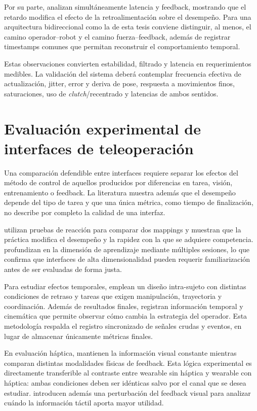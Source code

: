 Por su parte, \textcite{louca2024haptic} analizan simultáneamente latencia y feedback, mostrando que el retardo modifica el efecto de la retroalimentación sobre el desempeño. Para una arquitectura bidireccional como la de esta tesis conviene distinguir, al menos, el camino operador--robot y el camino fuerza--feedback, además de registrar timestamps comunes que permitan reconstruir el comportamiento temporal.

Estas observaciones convierten estabilidad, filtrado y latencia en requerimientos medibles. La validación del sistema deberá contemplar frecuencia efectiva de actualización, jitter, error y deriva de pose, respuesta a movimientos finos, saturaciones, uso de \textit{clutch}/recentrado y latencias de ambos sentidos.

\section{Evaluación experimental de interfaces de teleoperación}

Una comparación defendible entre interfaces requiere separar los efectos del método de control de aquellos producidos por diferencias en tarea, visión, entrenamiento o feedback. La literatura muestra además que el desempeño depende del tipo de tarea y que una única métrica, como tiempo de finalización, no describe por completo la calidad de una interfaz.

\textcite{wang2021mapping} utilizan pruebas de reacción para comparar dos mappings y muestran que la práctica modifica el desempeño y la rapidez con la que se adquiere competencia. \textcite{lee2023bodymachine} profundizan en la dimensión de aprendizaje mediante múltiples sesiones, lo que confirma que interfaces de alta dimensionalidad pueden requerir familiarización antes de ser evaluadas de forma justa.

Para estudiar efectos temporales, \textcite{rakita2020latency} emplean un diseño intra-sujeto con distintas condiciones de retraso y tareas que exigen manipulación, trayectoria y coordinación. Además de resultados finales, registran información temporal y cinemática que permite observar cómo cambia la estrategia del operador. Esta metodología respalda el registro sincronizado de señales crudas y eventos, en lugar de almacenar únicamente métricas finales.

En evaluación háptica, \textcite{park2022fingerfeedback} mantienen la información visual constante mientras comparan distintas modalidades físicas de feedback. Esta lógica experimental es directamente transferible al contraste entre wearable sin háptica y wearable con háptica: ambas condiciones deben ser idénticas salvo por el canal que se desea estudiar. \textcite{raveh2018vibrotactile} introducen además una perturbación del feedback visual para analizar cuándo la información táctil aporta mayor utilidad.

